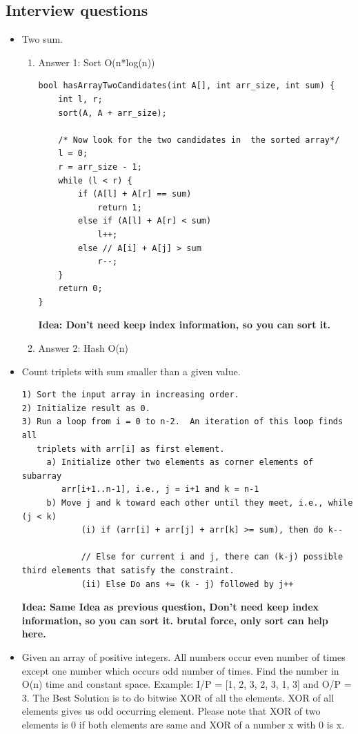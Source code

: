 \documentclass[a4paper,11pt,twoside]{book}
\begin{document}
\subsection{Interview questions}
\begin{itemize}
	\item Two sum. 
\begin{enumerate}
\item Answer 1: Sort O(n*log(n))
\begin{lstlisting}[tabsize=3]
bool hasArrayTwoCandidates(int A[], int arr_size, int sum) { 
	int l, r; 
	sort(A, A + arr_size); 
	
	/* Now look for the two candidates in  the sorted array*/
	l = 0; 
	r = arr_size - 1; 
	while (l < r) { 
		if (A[l] + A[r] == sum) 
			return 1; 
		else if (A[l] + A[r] < sum) 
			l++; 
		else // A[i] + A[j] > sum 
			r--; 
	} 
	return 0; 
} 
\end{lstlisting}
\textbf{Idea: Don't need keep index information, so you can sort it. }

\item Answer 2: Hash O(n)
\end{enumerate}

\item Count triplets with sum smaller than a given value. 
\begin{lstlisting}[breaklines]
1) Sort the input array in increasing order. 
2) Initialize result as 0.
3) Run a loop from i = 0 to n-2.  An iteration of this loop finds all
   triplets with arr[i] as first element.
     a) Initialize other two elements as corner elements of subarray 
        arr[i+1..n-1], i.e., j = i+1 and k = n-1
     b) Move j and k toward each other until they meet, i.e., while (j < k)
            (i) if (arr[i] + arr[j] + arr[k] >= sum), then do k-- 

            // Else for current i and j, there can (k-j) possible third elements that satisfy the constraint.
            (ii) Else Do ans += (k - j) followed by j++ 
\end{lstlisting}
\textbf{Idea: Same Idea as previous question, Don't need keep index information, so you can sort it. brutal force, only sort can help here.}


	\item Given an array of positive integers. All numbers occur even number of times except one number which occurs odd number of times. Find the number in O(n) time and constant space.
Example: I/P = [1, 2, 3, 2, 3, 1, 3] and O/P = 3. The Best Solution is to do bitwise XOR of all the elements. XOR of all elements gives us odd occurring element. Please note that XOR of two elements is 0 if both elements are same and XOR of a number x with 0 is x.


\end{itemize}
\end{document}
